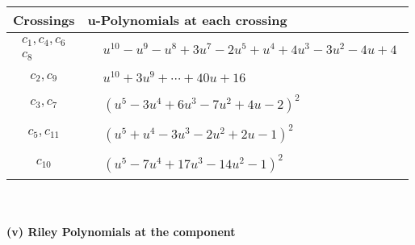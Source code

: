 \documentclass[1p]{elsarticle_modified}
\theoremstyle{definition}
\begin{document}
\begin{tabular}{m{50pt}|m{274pt}}
Crossings & \hspace{64pt}u-Polynomials at each crossing \\
\hline $$\begin{aligned}c_{1},c_{4},c_{6}\\c_{8}\end{aligned}$$&$\begin{aligned}
&u^{10}- u^9- u^8+3 u^7-2 u^5+u^4+4 u^3-3 u^2-4 u+4
\end{aligned}$\\
\hline $$\begin{aligned}c_{2},c_{9}\end{aligned}$$&$\begin{aligned}
&u^{10}+3 u^9+\cdots+40 u+16
\end{aligned}$\\
\hline $$\begin{aligned}c_{3},c_{7}\end{aligned}$$&$\begin{aligned}
&(u^5-3 u^4+6 u^3-7 u^2+4 u-2)^2
\end{aligned}$\\
\hline $$\begin{aligned}c_{5},c_{11}\end{aligned}$$&$\begin{aligned}
&(u^5+u^4-3 u^3-2 u^2+2 u-1)^2
\end{aligned}$\\
\hline $$\begin{aligned}c_{10}\end{aligned}$$&$\begin{aligned}
&(u^5-7 u^4+17 u^3-14 u^2-1)^2
\end{aligned}$\\
\hline
\end{tabular}\\~\\
\newpage\renewcommand{\arraystretch}{1}
\flushleft \textbf{(v) Riley Polynomials at the component}\newline \\
\end{document}
